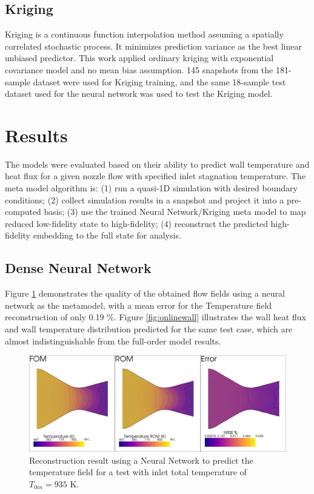 \documentclass[10pt,fleqn,a4paper,twoside]{article}
\begin{document}
\subsection{Kriging}

Kriging\cite{Forrester2008} is a continuous function interpolation method assuming a spatially correlated stochastic process. It minimizes prediction variance as the best linear unbiased predictor. This work applied ordinary kriging with exponential covariance model and no mean bias assumption. 145 snapshots from the 181-sample dataset were used for Kriging training, and the same 18-sample test dataset used for the neural network was used to test the Kriging model.

\section{Results}

The models were evaluated based on their ability to predict wall temperature and heat flux for a given nozzle flow with specified inlet stagnation temperature. The meta model algorithm is: (1) run a quasi-1D simulation with desired boundary conditions; (2) collect simulation results in a snapshot and project it into a pre-computed basis; (3) use the trained Neural Network/Kriging meta model to map reduced low-fidelity state to high-fidelity; (4) reconstruct the predicted high-fidelity embedding to the full state for analysis.

\subsection{Dense Neural Network}

Figure \ref{fig:onlinetest} demonstrates the quality of the obtained flow fields using a neural network as the metamodel, with a mean error for the Temperature field reconstruction of only 0.19 \%. Figure \ref{fig:onlinewall} illustrates the wall heat flux and wall temperature distribution predicted for the same test case, which are almost indistinguishable from the full-order model results.

\begin{figure}[!ht]
	\begin{center}
		\includegraphics[width=\textwidth]{images/online_test_2d.png}
		\newline
		\caption{Reconstruction result using a Neural Network to predict the temperature field for a test with inlet total temperature of $T_{0in}=935$ K.}
    \label{fig:onlinetest}
	\end{center}  
\end{figure}
\end{document}
